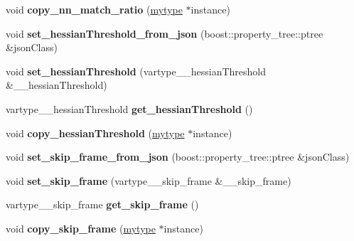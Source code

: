 \begin{DoxyCompactItemize}
void {\bfseries copy\+\_\+nn\+\_\+match\+\_\+ratio} (\hyperlink{classfilter_1_1algos_1_1_latch}{mytype} $\ast$instance)
\item 
\mbox{\label{classfilter_1_1algos_1_1_latch_adb819a37ba21540248d50820fee0d0a1}} 
void {\bfseries set\+\_\+hessian\+Threshold\+\_\+from\+\_\+json} (boost\+::property\+\_\+tree\+::ptree \&json\+Class)
\item 
\mbox{\label{classfilter_1_1algos_1_1_latch_a25b61c1b4867b25f89b7e1d1fce696a0}} 
void {\bfseries set\+\_\+hessian\+Threshold} (vartype\+\_\+\+\_\+hessian\+Threshold \&\+\_\+\+\_\+hessian\+Threshold)
\item 
\mbox{\label{classfilter_1_1algos_1_1_latch_a5d6bd2d38ca45f0dfbd985355d6a0d43}} 
vartype\+\_\+\+\_\+hessian\+Threshold {\bfseries get\+\_\+hessian\+Threshold} ()
\item 
\mbox{\label{classfilter_1_1algos_1_1_latch_a991ba994fb21bac7ae919211c9f41779}} 
void {\bfseries copy\+\_\+hessian\+Threshold} (\hyperlink{classfilter_1_1algos_1_1_latch}{mytype} $\ast$instance)
\item 
\mbox{\label{classfilter_1_1algos_1_1_latch_aaa3140375ec09d1ac3f397990d39ca58}} 
void {\bfseries set\+\_\+skip\+\_\+frame\+\_\+from\+\_\+json} (boost\+::property\+\_\+tree\+::ptree \&json\+Class)
\item 
\mbox{\label{classfilter_1_1algos_1_1_latch_aa42790da21c932d52d347fd597a511a7}} 
void {\bfseries set\+\_\+skip\+\_\+frame} (vartype\+\_\+\+\_\+skip\+\_\+frame \&\+\_\+\+\_\+skip\+\_\+frame)
\item 
\mbox{\label{classfilter_1_1algos_1_1_latch_a98acac9ffd5c25c3a9142fecc07e0b95}} 
vartype\+\_\+\+\_\+skip\+\_\+frame {\bfseries get\+\_\+skip\+\_\+frame} ()
\item 
\mbox{\label{classfilter_1_1algos_1_1_latch_a6a18218316dfc33984f861c971ac34a6}} 
void {\bfseries copy\+\_\+skip\+\_\+frame} (\hyperlink{classfilter_1_1algos_1_1_latch}{mytype} $\ast$instance)

\end{DoxyCompactItemize}
